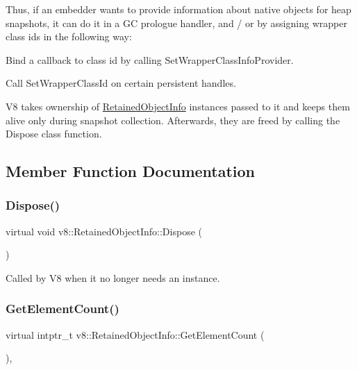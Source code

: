 Thus, if an embedder wants to provide information about native objects for heap snapshots, it can do it in a GC prologue handler, and / or by assigning wrapper class ids in the following way\+:


\begin{DoxyEnumerate}
\item Bind a callback to class id by calling Set\+Wrapper\+Class\+Info\+Provider.
\item Call Set\+Wrapper\+Class\+Id on certain persistent handles.
\end{DoxyEnumerate}

V8 takes ownership of \mbox{\hyperlink{classv8_1_1RetainedObjectInfo}{Retained\+Object\+Info}} instances passed to it and keeps them alive only during snapshot collection. Afterwards, they are freed by calling the Dispose class function. 

\subsection{Member Function Documentation}
\mbox{\label{classv8_1_1RetainedObjectInfo_a5011203f7c5949049ba36b8059f03eca}} 
\subsubsection{\texorpdfstring{Dispose()}{Dispose()}}
{\footnotesize\ttfamily virtual void v8\+::\+Retained\+Object\+Info\+::\+Dispose (\begin{DoxyParamCaption}{ }\end{DoxyParamCaption})\hspace{0.3cm}{\ttfamily [pure virtual]}}

Called by V8 when it no longer needs an instance. \mbox{\label{classv8_1_1RetainedObjectInfo_ae6865597469bc7d28bd8ec71b4b890bd}} 
\subsubsection{\texorpdfstring{Get\+Element\+Count()}{GetElementCount()}}
{\footnotesize\ttfamily virtual intptr\+\_\+t v8\+::\+Retained\+Object\+Info\+::\+Get\+Element\+Count (\begin{DoxyParamCaption}{ }\end{DoxyParamCaption})\hspace{0.3cm}{\ttfamily [inline]}, {\ttfamily [virtual]}}

